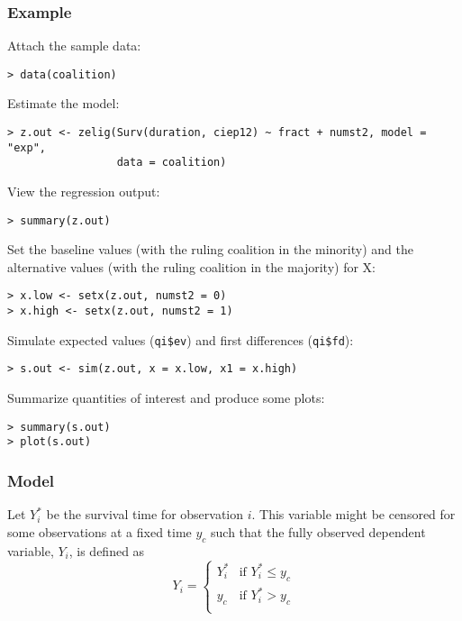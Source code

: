 \subsubsection{Example}

Attach the sample data: 
\begin{verbatim}
> data(coalition)
\end{verbatim}
Estimate the model: 
\begin{verbatim}
> z.out <- zelig(Surv(duration, ciep12) ~ fract + numst2, model = "exp", 
                 data = coalition)
\end{verbatim}
View the regression output:  
\begin{verbatim}
> summary(z.out)
\end{verbatim}
Set the baseline values (with the ruling coalition in the minority)
and the alternative values (with the ruling coalition in the majority)
for X:
\begin{verbatim}
> x.low <- setx(z.out, numst2 = 0)
> x.high <- setx(z.out, numst2 = 1)
\end{verbatim}
Simulate expected values ({\tt qi\$ev}) and first differences ({\tt qi\$fd}):
\begin{verbatim}
> s.out <- sim(z.out, x = x.low, x1 = x.high)
\end{verbatim}
Summarize quantities of interest and produce some plots:  
\begin{verbatim}
> summary(s.out)
> plot(s.out)
\end{verbatim}

\subsubsection{Model}

Let $Y_i^*$ be the survival time for observation $i$. This variable
might be censored for some observations at a fixed time $y_c$ such
that the fully observed dependent variable, $Y_i$, is defined as
\begin{equation*}
  Y_i = \left\{ \begin{array}{ll}
      Y_i^* & \textrm{if }Y_i^* \leq y_c \\
      y_c & \textrm{if }Y_i^* > y_c \\
    \end{array} \right.
\end{equation*}

